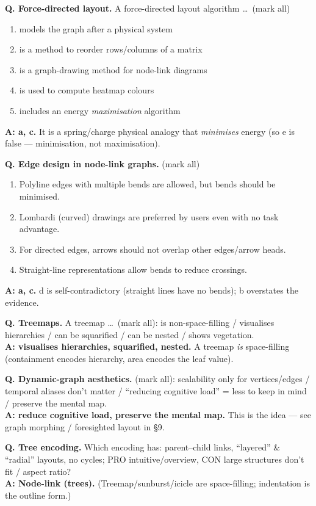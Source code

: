 \begin{qbox}
\textbf{Q. Force-directed layout.} A force-directed layout algorithm \dots\ (mark all)
\begin{enumerate}[label=\alph*.]
  \item models the graph after a physical system
  \item is a method to reorder rows/columns of a matrix
  \item is a graph-drawing method for node-link diagrams
  \item is used to compute heatmap colours
  \item includes an energy \emph{maximisation} algorithm
\end{enumerate}
\textbf{A: a, c.} It is a spring/charge physical analogy that \emph{minimises}
energy (so e is false --- minimisation, not maximisation).

\medskip
\textbf{Q. Edge design in node-link graphs.} (mark all)
\begin{enumerate}[label=\alph*.]
  \item Polyline edges with multiple bends are allowed, but bends should be minimised.
  \item Lombardi (curved) drawings are preferred by users even with no task advantage.
  \item For directed edges, arrows should not overlap other edges/arrow heads.
  \item Straight-line representations allow bends to reduce crossings.
\end{enumerate}
\textbf{A: a, c.} d is self-contradictory (straight lines have no bends); b
overstates the evidence.

\medskip
\textbf{Q. Treemaps.} A treemap \dots\ (mark all): is non-space-filling / visualises
hierarchies / can be squarified / can be nested / shows vegetation.\\
\textbf{A: visualises hierarchies, squarified, nested.} A treemap \emph{is}
space-filling (containment encodes hierarchy, area encodes the leaf value).

\medskip
\textbf{Q. Dynamic-graph aesthetics.} (mark all): scalability only for
vertices/edges / temporal aliases don't matter / ``reducing cognitive load'' =
less to keep in mind / preserve the mental map.\\
\textbf{A: reduce cognitive load, preserve the mental map.} This is the
 idea --- see graph morphing / foresighted layout
in \S9.

\medskip
\textbf{Q. Tree encoding.} Which encoding has: parent--child links, ``layered''
\& ``radial'' layouts, no cycles; PRO intuitive/overview, CON large structures
don't fit / aspect ratio?\\
\textbf{A: Node-link (trees).} (Treemap/sunburst/icicle are space-filling;
indentation is the outline form.)
\end{qbox}

